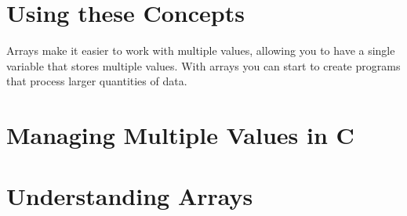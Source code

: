 \section{Using these Concepts} %
\label{sec:arrays_using_these_concepts}

Arrays make it easier to work with multiple values, allowing you to have a single variable that stores multiple values. With arrays you can start to create programs that process larger quantities of data.





\clearpage
\def\pageLang{c}
\section{Managing Multiple Values in C} %
\label{sec:arrays_in_c}









\clearpage
\def\pageLang{none}
\section{Understanding Arrays} %
\label{sec:understanding_arrays}




